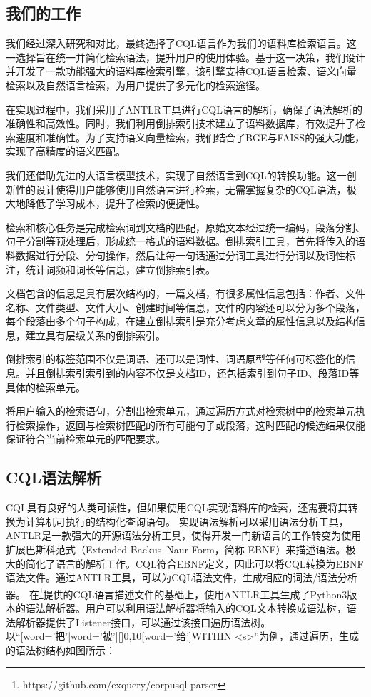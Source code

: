 \documentclass[11pt]{article}
\begin{document}
\begin{CJK*}{UTF8}{gbsn}
\section{我们的工作}

我们经过深入研究和对比，最终选择了CQL语言作为我们的语料库检索语言。这一选择旨在统一并简化检索语法，提升用户的使用体验。基于这一决策，我们设计并开发了一款功能强大的语料库检索引擎，该引擎支持CQL语言检索、语义向量检索以及自然语言检索，为用户提供了多元化的检索途径。

在实现过程中，我们采用了ANTLR工具进行CQL语言的解析，确保了语法解析的准确性和高效性。同时，我们利用倒排索引技术建立了语料数据库，有效提升了检索速度和准确性。为了支持语义向量检索，我们结合了BGE与FAISS的强大功能，实现了高精度的语义匹配。

我们还借助先进的大语言模型技术，实现了自然语言到CQL的转换功能。这一创新性的设计使得用户能够使用自然语言进行检索，无需掌握复杂的CQL语法，极大地降低了学习成本，提升了检索的便捷性。

检索和核心任务是完成检索词到文档的匹配，原始文本经过统一编码，段落分割、句子分割等预处理后，形成统一格式的语料数据。倒排索引工具，首先将传入的语料数据进行分段、分句操作，然后让每一句话通过分词工具进行分词以及词性标注，统计词频和词长等信息，建立倒排索引表。

文档包含的信息是具有层次结构的，一篇文档，有很多属性信息包括：作者、文件名称、文件类型、文件大小、创建时间等信息，文件的内容还可以分为多个段落，每个段落由多个句子构成，在建立倒排索引是充分考虑文章的属性信息以及结构信息，建立具有层级关系的倒排索引。

倒排索引的标签范围不仅是词语、还可以是词性、词语原型等任何可标签化的信息。并且倒排索引索引到的内容不仅是文档ID，还包括索引到句子ID、段落ID等具体的检索单元。


将用户输入的检索语句，分割出检索单元，通过遍历方式对检索树中的检索单元执行检索操作，返回与检索树匹配的所有可能句子或段落，这时匹配的候选结果仅能保证符合当前检索单元的匹配要求。


\subsection{CQL语法解析}

CQL具有良好的人类可读性，但如果使用CQL实现语料库的检索，还需要将其转换为计算机可执行的结构化查询语句。
实现语法解析可以采用语法分析工具，ANTLR是一款强大的开源语法分析工具，使得开发一门新语言的工作转变为使用扩展巴斯科范式（Extended Backus–Naur Form，简称 EBNF）来描述语法。极大的简化了语言的解析工作。CQL符合EBNF定义，因此可以将CQL转换为EBNF语法文件。通过ANTLR工具，可以为CQL语法文件，生成相应的词法/语法分析器。
在\footnote[1]{https://github.com/exquery/corpusql-parser}提供的CQL语言描述文件的基础上，使用ANTLR工具生成了Python3版本的语法解析器。用户可以利用语法解析器将输入的CQL文本转换成语法树，语法解析器提供了Listener接口，可以通过该接口遍历语法树。
以“[word='把'|word='被'][]{0,10}[word='给']WITHIN <s>”为例，通过遍历，生成的语法树结构如图所示：


\end{CJK*}
\end{document}
